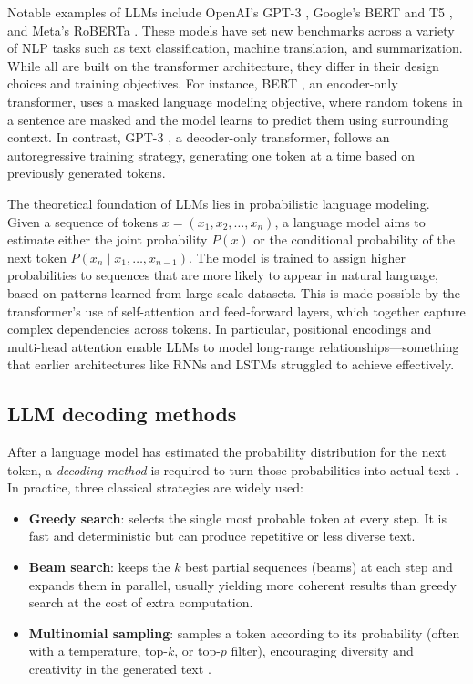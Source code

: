 Notable examples of LLMs include OpenAI's GPT-3 \citep{gpt3Paper}, Google's BERT \citep{bertPaper} and T5 \citep{t5GooglePaper}, and Meta's RoBERTa \citep{robertaPaper}. These models have set new benchmarks across a variety of NLP tasks such as text classification, machine translation, and summarization. While all are built on the transformer architecture, they differ in their design choices and training objectives. For instance, BERT \citep{bertPaper}, an encoder-only transformer, uses a masked language modeling objective, where random tokens in a sentence are masked and the model learns to predict them using surrounding context. In contrast, GPT-3 \citep{gpt3Paper}, a decoder-only transformer, follows an autoregressive training strategy, generating one token at a time based on previously generated tokens.

The theoretical foundation of LLMs lies in probabilistic language modeling. Given a sequence of tokens \( x = (x_1, x_2, \dots, x_n) \), a language model aims to estimate either the joint probability \( P(x) \) or the conditional probability of the next token \( P(x_n \mid x_1, \dots, x_{n-1}) \). The model is trained to assign higher probabilities to sequences that are more likely to appear in natural language, based on patterns learned from large-scale datasets. This is made possible by the transformer's use of self-attention and feed-forward layers, which together capture complex dependencies across tokens. In particular, positional encodings and multi-head attention enable LLMs to model long-range relationships—something that earlier architectures like RNNs and LSTMs struggled to achieve effectively.


\subsection{LLM decoding methods}

After a language model has estimated the probability distribution for the next token, a \emph{decoding method} is required to turn those probabilities into actual text \citep{Shi2024DecodingMethods}. In practice, three classical strategies are widely used:

\begin{itemize}
    \item \textbf{Greedy search}: selects the single most probable token at every step. It is fast and deterministic but can produce repetitive or less diverse text.
    \item \textbf{Beam search}: keeps the \(k\) best partial sequences (beams) at each step and expands them in parallel, usually yielding more coherent results than greedy search at the cost of extra computation.
    \item \textbf{Multinomial sampling}: samples a token according to its probability (often with a temperature, top-\(k\), or top-\(p\) filter), encouraging diversity and creativity in the generated text \citep{Qin2025DynamicWidthSpeculativeBeamDecoding}.
\end{itemize}



